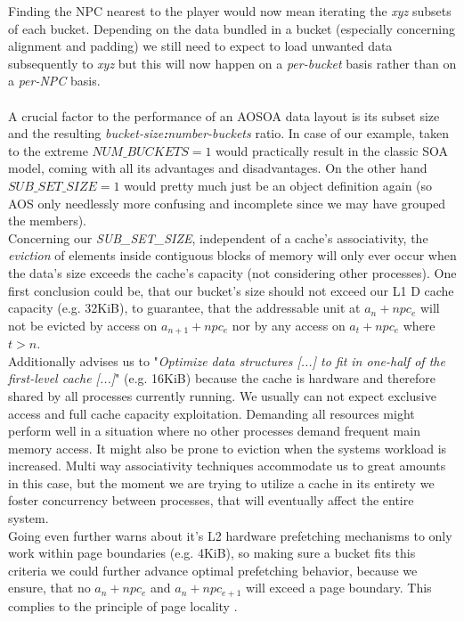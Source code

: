 Finding the NPC nearest to the player would now mean iterating the \textit{xyz} subsets of each bucket. Depending on the data bundled in a bucket (especially concerning alignment and padding) we still need to expect to load unwanted data subsequently to \textit{xyz} but this will now happen on a \textit{per-bucket} basis rather than on a \textit{per-NPC} basis.\\\\
A crucial factor to the performance of an AOSOA data layout is its subset size and the resulting \textit{bucket-size\textbf{:}number-buckets} ratio. In case of our  example, taken to the extreme $\textit{NUM\_BUCKETS}=1$ would practically result in the classic SOA model, coming with all its advantages and disadvantages. On the other hand $\textit{SUB\_SET\_SIZE}=1$ would pretty much just be an object definition again (so AOS only needlessly more confusing and incomplete since we may have grouped the members).\\
Concerning our \textit{SUB\_SET\_SIZE}, independent of a cache's associativity, the \textit{eviction} of elements inside contiguous blocks of memory  will only ever occur when the data's size exceeds the cache's capacity (not considering other processes). One first conclusion could be, that our bucket's size should not exceed our L1 D cache capacity (e.g. 32KiB), to guarantee, that the addressable unit at $a_n + npc_e$ will not be evicted by access on $a_{n+1}+npc_e$ nor by any access on $a_t+npc_e$ where $t > n$.\\
Additionally  advises us to "\textit{Optimize data structures [...] to fit in one-half of the first-level cache [...]}" (e.g. 16KiB) because the cache is hardware and therefore shared by all processes currently running. We usually can not expect exclusive access and full cache capacity exploitation. Demanding all resources might perform well in a situation where no other processes demand frequent main memory access. It might also be prone to eviction when the systems workload is increased. Multi way associativity techniques accommodate us to great amounts in this case, but the moment we are trying to utilize a cache in its entirety we foster concurrency between processes, that will eventually affect the entire system.\\
Going even further  warns about it's L2 hardware prefetching mechanisms to only work within page boundaries (e.g. 4KiB), so making sure a bucket fits this criteria we could further advance optimal prefetching behavior, because we ensure, that no $a_n+npc_e$ and $a_n+npc_{e+1}$ will exceed a page boundary. This complies to the principle of page locality .\\
